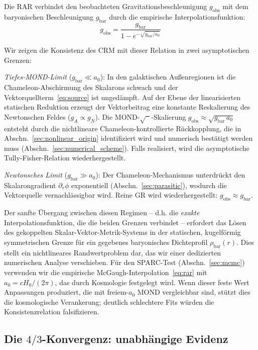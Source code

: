 \documentclass[aps,prd,twocolumn,superscriptaddress,nofootinbib]{revtex4-2}
\begin{document}
Die RAR \cite{McGaugh2016} verbindet den beobachteten Gravitationsbeschleunigung $g_{\mathrm{obs}}$ mit dem baryonischen Beschleunigung $g_{\mathrm{bar}}$ durch die empirische Interpolationsfunktion:
\begin{equation}
g_{\mathrm{obs}} = \frac{g_{\mathrm{bar}}}{1 - e^{-\sqrt{g_{\mathrm{bar}}/a_0}}}
\label{eq:rar}
\end{equation}

Wir zeigen die Konsistenz des CRM mit dieser Relation in zwei asymptotischen Grenzen:

\textit{Tiefes-MOND-Limit} ($g_{\mathrm{bar}} \ll a_0$): In den galaktischen Au\ss{}enregionen ist die Chameleon-Abschirmung des Skalarons schwach und der Vektorquellterm~\eqref{eq:source} ist unged\"ampft. Auf der Ebene der linearisierten statischen Reduktion erzeugt der Vektorbeitrag eine konstante Reskalierung des Newtonschen Feldes ($g_A \propto g_N$). Die MOND-$\sqrt{\phantom{x}}$-Skalierung $g_{\mathrm{obs}} \approx \sqrt{g_{\mathrm{bar}}\,a_0}$ entsteht durch die nichtlineare Chameleon-kontrollierte R\"uckkopplung, die in Abschn.~\ref{sec:nonlinear_origin} identifiziert wird und numerisch best\"atigt werden muss (Abschn.~\ref{sec:numerical_scheme}). Falls realisiert, wird die asymptotische Tully-Fisher-Relation wiederhergestellt.

\textit{Newtonsches Limit} ($g_{\mathrm{bar}} \gg a_0$): Der Chameleon-Mechanismus unterdr\"uckt den Skalarongradient $\partial_r\phi$ exponentiell (Abschn.~\ref{sec:parasitic}), wodurch die Vektorquelle vernachl\"assigbar wird. Reine GR wird wiederhergestellt: $g_{\mathrm{obs}} \approx g_{\mathrm{bar}}$.

Der sanfte \"Ubergang zwischen diesen Regimen -- d.h. die \textit{exakte} Interpolationsfunktion, die die beiden Grenzen verbindet -- erfordert das L\"osen des gekoppelten Skalar-Vektor-Metrik-Systems in der statischen, kugelf\"ormig symmetrischen Grenze f\"ur ein gegebenes baryonisches Dichteprofil $\rho_{\mathrm{bar}}(r)$. Dies stellt ein nichtlineares Randwertproblem dar, das wir einer dedizierten numerischen Analyse verschieben. F\"ur den SPARC-Test (Abschn.~\ref{sec:mcmc}) verwenden wir die empirische McGaugh-Interpolation~\eqref{eq:rar} mit $a_0 = cH_0/(2\pi)$, das durch Kosmologie festgelegt wird. Wenn dieser feste Wert Anpassungen produziert, die mit freiem-$a_0$ MOND vergleichbar sind, st\"utzt dies die kosmologische Verankerung; deutlich schlechtere Fits w\"urden die Konsistenzrelation falsifizieren.

\subsection{Die $4/3$-Konvergenz: unabh\"angige Evidenz}
\label{sec:four_thirds}
\end{document}
